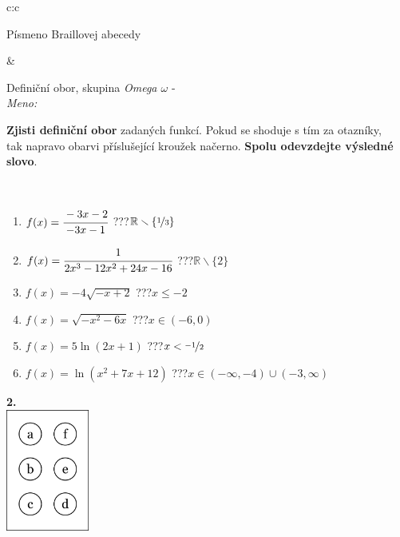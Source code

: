 \documentclass[10pt]{report}
\begin{document}
\begin{tabular}{c:c}
\begin{minipage}[c][104.5mm][t]{0.5\linewidth}
\begin{center}
\begin{minipage}{0.20\linewidth}
\begin{center}
{\small Písmeno Braillovej abecedy}
\end{center}
\end{minipage}
\end{center}
\end{minipage}
&
\begin{minipage}[c][104.5mm][t]{0.5\linewidth}
\begin{center}
\vspace{7mm}
{\huge Definiční obor, skupina \textit{Omega $\omega$} -}\\[5mm]
\textit{Meno:}\phantom{xxxxxxxxxxxxxxxxxxxxxxxxxxxxxxxxxxxxxxxxxxxxxxxxxxxxxxxxxxxxxxxxx}\\[5mm]
\begin{minipage}{0.95\linewidth}
\textbf{Zjisti definiční obor} zadaných funkcí. Pokud se shoduje s tím za otazníky,\\tak napravo obarvi příslušející kroužek načerno. \textbf{Spolu odevzdejte výsledné slovo}.
\end{minipage}
\\[1mm]
\begin{minipage}{0.79\linewidth}
\begin{center}
\begin{varwidth}{\linewidth}
\begin{enumerate}
\normalsizerrr
\item $f(x)=\cfrac{-3x-2}{-3x-1}$\quad \dotfill\; ???\;\dotfill \quad $\mathbb{R}\smallsetminus\{\nicefrac{1}{3}\}$
\item $f(x)=\cfrac{1}{2x^3-12x^2+24x-16}$\quad \dotfill\; ???\;\dotfill \quad $\mathbb{R}\smallsetminus\{2\}$
\item $f(x)=-4\sqrt{-x+2}$\quad \dotfill\; ???\;\dotfill \quad $x\leq-2$
\item $f(x)=\sqrt{-x^2-6x}$\quad \dotfill\; ???\;\dotfill \quad $x\in(-6 , 0)$
\item $f(x)=5\ln{(2x+1)}$\quad \dotfill\; ???\;\dotfill \quad $x<\nicefrac{-1}{2}$
\item $f(x)=\ln{(x^2+7x+12)}$\quad \dotfill\; ???\;\dotfill \quad $x\in(-\infty , -4)\cup(-3 , \infty)$
\end{enumerate}
\end{varwidth}
\end{center}
\end{minipage}
\begin{minipage}{0.20\linewidth}
\begin{center}
{\Huge\bfseries 2.} \\[2mm]
\includegraphics[height=40mm]{../images/braille.png}

\end{center}
\end{minipage}
\end{center}
\end{minipage}
\end{tabular}
\end{document}
